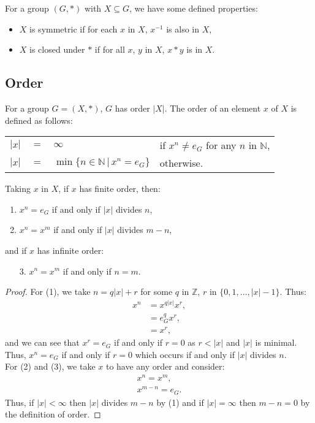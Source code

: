 For a group $(G, \ast)$ with $X \subseteq G$, we have some defined properties:
\begin{itemize}
    \item $X$ is symmetric if for each $x$ in $X$, $x^{-1}$ is also in $X$,
    \item $X$ is closed under $\ast$ if for all $x$, $y$ in $X$, $x \ast y$ is in $X$.
\end{itemize}

\subsection{Order}

For a group $G = (X, \ast)$, $G$ has order $|X|$. The order of an element $x$ of
$X$ is defined as follows: \begin{center}
    \begin{tabular}{ r c l l }
        $|x|$ & $=$ & $\infty$ & if $x^n \neq e_G$ for any $n$ in $\mathbb{N}$, \\
        $|x|$ & $=$ & $\min\{n \in \mathbb{N} \, | \, x^n = e_G\}$ & otherwise. 
    \end{tabular}
\end{center} Taking $x$ in $X$, if $x$ has finite order, then: \begin{enumerate}
    \item $x^n = e_G$ if and only if $|x|$ divides $n$,
    \item $x^n = x^m$ if and only if $|x|$ divides $m - n$,
\end{enumerate} and if $x$ has infinite order: \begin{enumerate}
    \item[3.] $x^n = x^m$ if and only if $n = m$.
\end{enumerate}

\newpage

\begin{proof}
    For (1), we take $n = q|x| + r$ for some $q$ in $\mathbb{Z}$, 
    $r$ in $\{0, 1, \ldots, |x| - 1\}$. Thus: \begin{align*}
        x^n &= x^{q|x|}x^r, \\
        &= e_G^qx^r, \\
        &= x^r,
    \end{align*} and we can see that $x^r = e_G$ if and only if $r = 0$ as $r < |x|$
    and $|x|$ is minimal. Thus, $x^n = e_G$ if and only if $r = 0$ which occurs
    if and only if $|x|$ divides $n$.
    \\[\baselineskip]
    For (2) and (3), we take $x$ to have any order and consider: \begin{align*}
        x^n = x^m, \\
        x^{m - n} = e_G.
    \end{align*} Thus, if $|x| < \infty$ then $|x|$ divides $m - n$ by (1) and
    if $|x| = \infty$ then $m - n = 0$ by the definition of order.
\end{proof}

